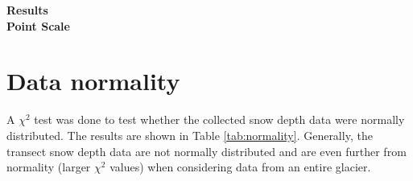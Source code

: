 \documentclass[12pt]{article}
\begin{document}

\begin{center}
\Large \textbf{Results\\ Point Scale}
\end{center}


\tableofcontents
\pagebreak

\section{Data normality}

A $\chi^2$ test was done to test whether the collected snow depth data were normally distributed. The results are shown in Table \ref{tab:normality}. Generally, the transect snow depth data are not normally distributed and are even further from normality (larger $\chi^2$ values) when considering data from an entire glacier.
\end{document}
